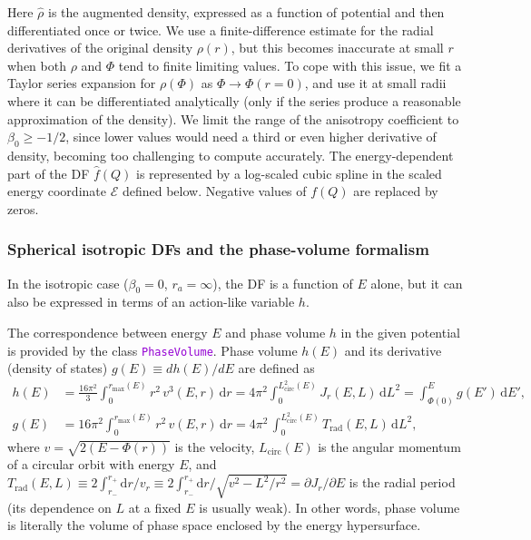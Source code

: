 \documentclass[12pt]{article}
\newcommand{\ttt}[1]{\textcolor{darkviolet}{\texttt{#1}}}
\renewcommand{\d}{\mathrm{d}}
\newcommand{\D}{\partial}
\newcommand{\scE}{\mathscr E}
\begin{document}
Here $\hat\rho$ is the augmented density, expressed as a function of potential and then differentiated once or twice.
We use a finite-difference estimate for the radial derivatives of the original density $\rho(r)$, but this becomes inaccurate at small $r$ when both $\rho$ and $\Phi$ tend to finite limiting values. To cope with this issue, we fit a Taylor series expansion for $\rho(\Phi)$ as $\Phi \to \Phi(r=0)$, and use it at small radii where it can be differentiated analytically (only if the series produce a reasonable approximation of the density). We limit the range of the anisotropy coefficient to $\beta_0 \ge -1/2$, since lower values would need a third or even higher derivative of density, becoming too challenging to compute accurately.
The energy-dependent part of the DF $\hat f(Q)$ is represented by a log-scaled cubic spline in the scaled energy coordinate $\scE$ defined below. Negative values of $f(Q)$ are replaced by zeros.


\subsubsection{Spherical isotropic DFs and the phase-volume formalism}  \label{sec:DFsphericalIsotropicDetails}

In the isotropic case ($\beta_0=0$, $r_a=\infty$), the DF is a function of $E$ alone, but it can also be expressed in terms of an action-like variable $h$.

The correspondence between energy $E$ and phase volume $h$ in the given potential is provided by the class \ttt{PhaseVolume}. Phase volume $h(E)$ and its derivative (density of states) $g(E)\equiv dh(E)/dE$ are defined as
\begin{subequations}
\begin{align}
h(E) &= \frac{16\pi^2}3 \int_0^{r_\mathrm{max}(E)} r^2\, v^3(E,r)\, \d r =
  4\pi^2\int_0^{L^2_\mathrm{circ}(E)} J_r(E,L)\,\d L^2 =
  \int_{\Phi(0)}^E g(E')\, \d E' ,\\
g(E) &= 16\pi^2 \int_0^{r_\mathrm{max}(E)} r^2\, v(E,r)\, \d r =
  4\pi^2\, \int_0^{L_\mathrm{circ}^2(E)} T_\mathrm{rad}(E,L)\,\d L^2,
\end{align}
\end{subequations}
where  $v = \sqrt{2(E-\Phi(r))}$ is the velocity,  $L_\mathrm{circ}(E)$ is the angular momentum of a circular orbit with energy $E$,  and  $T_\mathrm{rad}(E,L) \equiv 2 \int_{r_-}^{r_+} \d r/v_r \equiv 2 \int_{r_-}^{r_+} \d r/\sqrt{v^2-L^2/r^2} = \D J_r/\D E$  is the radial period (its dependence on $L$ at a fixed $E$ is usually weak).
In other words, phase volume is literally the volume of phase space enclosed by the energy hypersurface.
\end{document}
